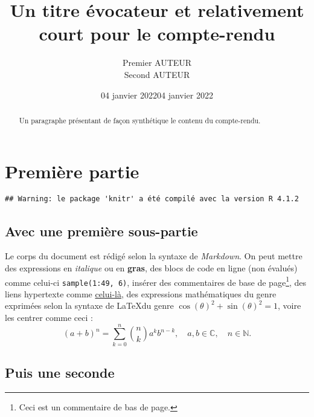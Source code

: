 \documentclass[french,]{compterendu}
\title{Un titre évocateur et relativement court pour le compte-rendu}
\author{Premier AUTEUR \\ Second AUTEUR}
\date{04 janvier 2022}
\date{04 janvier 2022}
\let\rmarkdownfootnote\footnote%
\def\footnote{\protect\rmarkdownfootnote}
\theoremstyle{definition}
\theoremstyle{definition}
\theoremstyle{definition}
\theoremstyle{definition}
\theoremstyle{remark}
\begin{document}



\maketitle

\pagebreak

\begin{abstract}
Un paragraphe présentant de façon synthétique le contenu du compte-rendu.
\end{abstract}



{
\hypersetup{linkcolor=black}
\setcounter{tocdepth}{2}
\tableofcontents
}



\hypertarget{premiuxe8re-partie}{%
\section{Première partie}\label{premiuxe8re-partie}}

\begin{verbatim}
## Warning: le package 'knitr' a été compilé avec la version R 4.1.2
\end{verbatim}

\hypertarget{avec-une-premiuxe8re-sous-partie}{%
\subsection{Avec une première sous-partie}\label{avec-une-premiuxe8re-sous-partie}}

Le corps du document est rédigé selon la syntaxe de \emph{Markdown}. On peut mettre des expressions en \emph{italique} ou en \textbf{gras}, des blocs de code en ligne (non évalués) comme celui-ci \texttt{sample(1:49,\ 6)}, insérer des commentaires de base de page\footnote{Ceci est un commentaire de bas de page.}, des liens hypertexte comme \href{http://univ-reims.fr}{celui-là}, des expressions mathématiques du genre exprimées selon la syntaxe de \LaTeX du genre \(\cos(\theta) ^2 + \sin(\theta)^2 = 1\), voire les centrer comme ceci :
\[(a+b)^n = \sum_{k=0}^n {n \choose k} a^k b^{n-k}, \quad a,b \in \mathbb{C}, \quad n \in \mathbb{N}.\]

\hypertarget{puis-une-seconde}{%
\subsection{Puis une seconde}\label{puis-une-seconde}}
\end{document}
